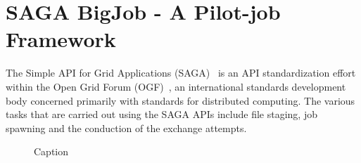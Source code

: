 \documentclass[a4paper,10pt]{article}
\newcommand{\alnote}[1]{ {\textcolor{blue} { ***andre: #1 }}}
\newcommand{\athotanote}[1]{ {\textcolor{green} { ***athota: #1 }}}
\newcommand{\alnote}[1]{}
\newcommand{\athotanote}[1]{}
\begin{document}



\section{SAGA BigJob - A Pilot-job Framework}

The Simple API for Grid Applications (SAGA)~\cite{saga_gfd90} is an API standardization effort within the Open Grid Forum (OGF)~\cite{ogf_web}, an international standards development body concerned primarily with standards for distributed computing. The various tasks that are carried out using the SAGA APIs include file staging, job spawning and the conduction of the exchange attempts.


 \begin{figure}
\centering
 
\label{fig:sync}
\caption{\small Caption}
\end{figure}
\end{document}
